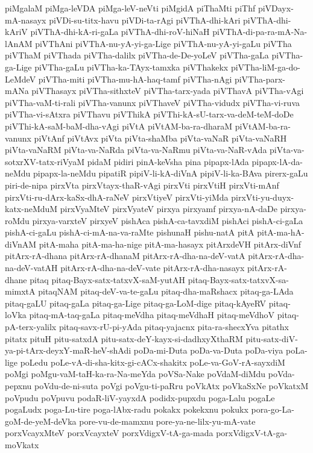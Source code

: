 {piMgalaM
piMga-leVDA
piMga-leV-neVti
piMgidA
piThaMti
piThf
piVDayx-mA-nasayx
piVDi-su-titx-havu
piVDi-ta-rAgi
piVThA-dhi-kAri
piVThA-dhi-kAriV
piVThA-dhi-kA-ri-gaLa
piVThA-dhi-roV-hiNaH
piVThA-di-pa-ra-mA-Na-lAnAM
piVThAni
piVThA-nu-yA-yi-ga-Lige
piVThA-nu-yA-yi-gaLu
piVTha
piVThaM
piVThada
piVTha-dalilx
piVTha-de-De-yoLeV
piVTha-gaLa
piVTha-ga-Lige
piVTha-gaLu
piVTha-ka-TAyx-tamxka
piVThakekx
piVTha-liM-ga-do-LeMdeV
piVTha-miti
piVTha-mu-hA-haq-tamf
piVTha-nAgi
piVTha-parx-mANa
piVThasayx
piVTha-sithxteV
piVTha-tarx-yada
piVThavA
piVTha-vAgi
piVTha-vaM-ti-rali
piVTha-vanunx
piVThaveV
piVTha-vidudx
piVTha-vi-ruva
piVTha-vi-sAtxra
piVThavu
piVThikA
piVThi-kA-sU-tarx-va-deM-teM-doDe
piVThi-kA-saM-baM-dha-vAgi
piVtA
piVtAM-ba-ra-dharaM
piVtAM-ba-ra-vanunx
piVtAnf
piVtAvx
piVta
piVta-shaMba
piVta-vaNaR
piVta-vaNaRH
piVta-vaNaRM
piVta-va-NaRda
piVta-va-NaRmu
piVta-va-NaR-vAda
piVta-va-sotxrXV-tatx-riVyaM
pidaM
pidiri
pinA-keVsha
pina
pipapx-lAda
pipapx-lA-da-neMdu
pipapx-la-neMdu
pipatiR
pipiV-li-kA-diVnA
pipiV-li-ka-BAva
pirerx-gaLu
piri-de-nipa
pirxVta
pirxVtayx-thaR-vAgi
pirxVti
pirxVtiH
pirxVti-mAnf
pirxVti-ru-dArx-kaSx-dhA-raNeV
pirxVtiyeV
pirxVti-yiMda
pirxVti-yu-duyx-katx-neMduM
pirxVyaMteV
pirxVyateV
pirxya
pirxyamf
pirxya-nA-daDe
pirxya-roMdu
pirxya-varxteV
pirxyeV
pishAca
pishA-ca-tavxdiM
pishAci
pishA-ci-gaLa
pishA-ci-gaLu
pishA-ci-mA-na-va-raMte
pishunaH
pishu-natA
pitA
pitA-ma-hA-diVnAM
pitA-maha
pitA-ma-ha-nige
pitA-ma-hasayx
pitArxdeVH
pitArx-diVnf
pitArx-rA-dhana
pitArx-rA-dhanaM
pitArx-rA-dha-na-deV-vatA
pitArx-rA-dha-na-deV-vatAH
pitArx-rA-dha-na-deV-vate
pitArx-rA-dha-nasayx
pitArx-rA-dhane
pitaq
pitaq-Bayx-satx-tatxvX-saM-yutAH
pitaq-Bayx-satx-tatxvX-sa-mimxtA
pitaqNAM
pitaq-deV-va-te-gaLu
pitaq-dha-maRshacx
pitaq-ga-LAda
pitaq-gaLU
pitaq-gaLa
pitaq-ga-Lige
pitaq-ga-LoM-dige
pitaq-kAyeRV
pitaq-loVka
pitaq-mA-taq-gaLa
pitaq-meVdha
pitaq-meVdhaH
pitaq-meVdhoV
pitaq-pA-terx-yalilx
pitaq-savx-rU-pi-yAda
pitaq-yajacnx
pita-ra-shecxYva
pitathx
pitatx
pituH
pitu-satxdA
pitu-satx-deY-kayx-si-dadhxyXthaRM
pitu-satx-diV-ya-pi-tArx-deyxY-maR-heV-shAdi
poDa-mi-Duta
poDa-va-Duta
poDa-viya
poLa-lige
poLedu
poLe-vA-di-sha-kitx-gi-cACx-shakitx
poLe-va-GoV-rA-sayxdiM
poMgi
poMgu-vaM-taH-ka-ra-Na-meYda
poVSa-Nake
poVdaM-diMdu
poVda-pepxnu
poVdu-de-ni-suta
poVgi
poVgu-ti-paRru
poVkAtx
poVkaSxNe
poVkatxM
poVpudu
poVpuvu
podaR-liV-yayxdA
podidx-pupxdu
poga-Lalu
pogaLe
pogaLudx
poga-Lu-tire
poga-lAbx-radu
pokakx
pokekxnu
pokukx
pora-go-La-goM-de-yeM-deVka
pore-vu-de-mamxnu
pore-ya-ne-lilx-yu-mA-vate
porxVcayxMteV
porxVcayxteV
porxVdigxV-tA-ga-mada
porxVdigxV-tA-ga-moVkatx
}
